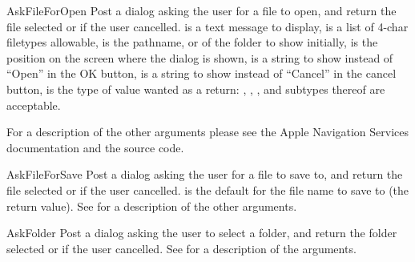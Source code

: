 \begin{funcdesc}{AskFileForOpen}{
	}
Post a dialog asking the user for a file to open, and return the file
selected or  if the user cancelled.
 is a text message to display,
 is a list of 4-char filetypes allowable,
 is the pathname,  or 
of the folder to show initially,
 is the  position on the screen where the
dialog is shown,
 is a string to show instead of ``Open'' in the
OK button,
 is a string to show instead of ``Cancel'' in the
cancel button,
 is the type of value wanted as a return: ,
, ,  and subtypes thereof are
acceptable.

For a description of the other arguments please see the Apple Navigation
Services documentation and the  source code.
\end{funcdesc}

\begin{funcdesc}{AskFileForSave}{
	}
Post a dialog asking the user for a file to save to, and return the
file selected or  if the user cancelled.
 is the default for the file name to save to (the
return value). See  for a description of
the other arguments.
\end{funcdesc}

\begin{funcdesc}{AskFolder}{
	}
Post a dialog asking the user to select a folder, and return the
folder selected or  if the user cancelled. See
 for a description of the arguments.
\end{funcdesc}


